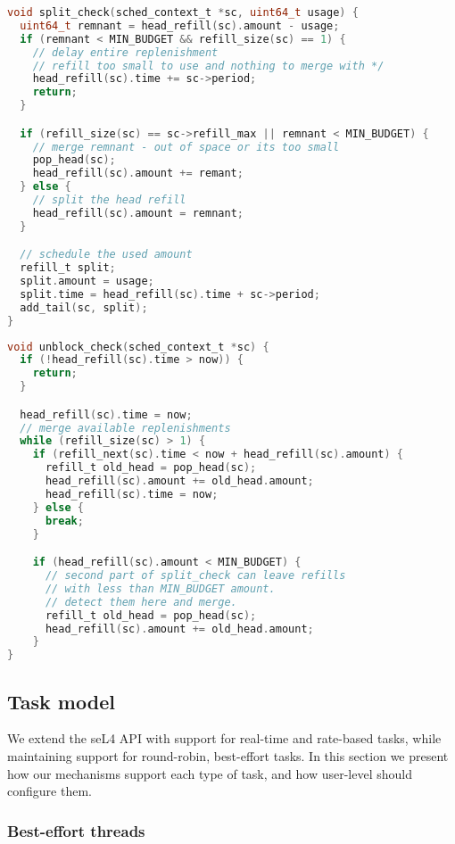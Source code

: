 \begin{lstlisting}[frame=single,language=c,caption=Split check routine.,label=list:split-check,float=htpb]
void split_check(sched_context_t *sc, uint64_t usage) {
  uint64_t remnant = head_refill(sc).amount - usage;
  if (remnant < MIN_BUDGET && refill_size(sc) == 1) {
    // delay entire replenishment
    // refill too small to use and nothing to merge with */
    head_refill(sc).time += sc->period;
    return;
  }

  if (refill_size(sc) == sc->refill_max || remnant < MIN_BUDGET) {
    // merge remnant - out of space or its too small
    pop_head(sc);
    head_refill(sc).amount += remant;
  } else {
    // split the head refill
    head_refill(sc).amount = remnant;
  }

  // schedule the used amount
  refill_t split;
  split.amount = usage;
  split.time = head_refill(sc).time + sc->period;
  add_tail(sc, split);
}
\end{lstlisting}

\begin{lstlisting}[frame=single,language=c,caption=Unblock check routine.,label=list:unblock-check,float=htpb]
void unblock_check(sched_context_t *sc) {
  if (!head_refill(sc).time > now)) {
    return;
  }

  head_refill(sc).time = now;
  // merge available replenishments
  while (refill_size(sc) > 1) {
    if (refill_next(sc).time < now + head_refill(sc).amount) {
      refill_t old_head = pop_head(sc);
      head_refill(sc).amount += old_head.amount;
      head_refill(sc).time = now;
    } else {
      break;
    }

    if (head_refill(sc).amount < MIN_BUDGET) {
      // second part of split_check can leave refills
      // with less than MIN_BUDGET amount.
      // detect them here and merge.
      refill_t old_head = pop_head(sc);
      head_refill(sc).amount += old_head.amount;
    }
}
\end{lstlisting}


\subsection{Task model}

We extend the seL4 API with support for real-time and rate-based tasks, while maintaining support for round-robin, best-effort tasks.
In this section we present how our mechanisms support each type of task, and how user-level should configure them.

\subsubsection{Best-effort threads}

